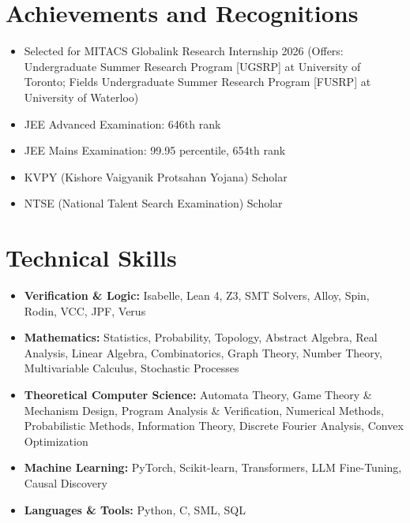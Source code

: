 \documentclass[a4paper,10pt]{article}
\begin{document}
\section*{Achievements and Recognitions}
\begin{itemize}
    \item Selected for MITACS Globalink Research Internship 2026 (Offers: Undergraduate Summer Research Program [UGSRP] at University of Toronto; Fields Undergraduate Summer Research Program [FUSRP] at University of Waterloo)
    \item JEE Advanced Examination: 646th rank
    \item JEE Mains Examination: 99.95 percentile, 654th rank
    \item KVPY (Kishore Vaigyanik Protsahan Yojana) Scholar
    \item NTSE (National Talent Search Examination) Scholar
\end{itemize}

\section*{Technical Skills}
\begin{itemize}
    \item \textbf{Verification \& Logic:} Isabelle, Lean 4, Z3, SMT Solvers, Alloy, Spin, Rodin, VCC, JPF, Verus
    \item \textbf{Mathematics:} Statistics, Probability, Topology, Abstract Algebra, Real Analysis, Linear Algebra, Combinatorics, Graph Theory, Number Theory, Multivariable Calculus, Stochastic Processes
    \item \textbf{Theoretical Computer Science:} Automata Theory, Game Theory \& Mechanism Design, Program Analysis \& Verification, Numerical Methods, Probabilistic Methods, Information Theory, Discrete Fourier Analysis, Convex Optimization
    \item \textbf{Machine Learning:} PyTorch, Scikit-learn, Transformers, LLM Fine-Tuning, Causal Discovery
    \item \textbf{Languages \& Tools:} Python, C, SML, SQL

\end{itemize}

\end{document}
